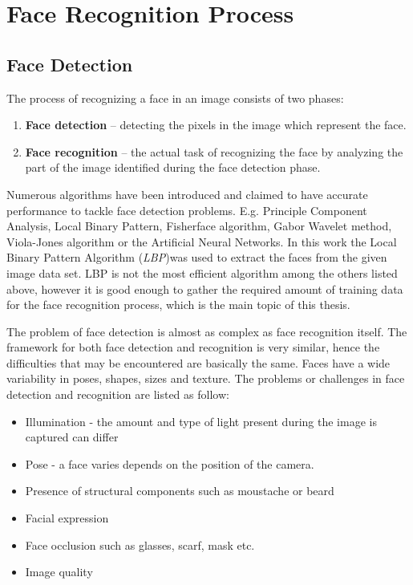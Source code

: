 
\chapter{Face Recognition Process}

\section{Face Detection}
The process of recognizing a face in an image consists of two phases:

\begin{enumerate}
\itemsep0em
\item \textbf{Face detection} – detecting the pixels in the image which represent the face. 
\item \textbf{Face recognition} – the actual task of recognizing the face by analyzing the part of the image identified during the face detection phase.
\end{enumerate}

Numerous algorithms have been introduced and claimed to have accurate performance to tackle face detection problems. E.g. Principle Component Analysis, Local Binary Pattern, Fisherface algorithm, Gabor Wavelet method, Viola-Jones algorithm or the Artificial Neural Networks. In this work the Local Binary Pattern Algorithm (\textit{LBP})was used to extract the faces from the given image data set. LBP is not the most efficient algorithm among the others listed above, however it is good enough to gather the required amount of training data for the face recognition process, which is the main topic of this thesis. 

The problem of face detection is almost as complex as face recognition itself. The framework for both face detection and recognition is very similar, hence the difficulties that may be encountered are basically the same.
Faces have a wide variability in poses, shapes, sizes and texture. The problems or challenges in face detection and recognition are listed as follow:

\begin{itemize}
\itemsep0em
\item Illumination - the amount and type of light present during the image is captured can differ
\item Pose - a face varies depends on the position of the camera.
\item Presence of structural components such as moustache or beard
\item Facial expression 
\item Face occlusion such as glasses, scarf, mask etc.
\item Image quality 
\end{itemize}


